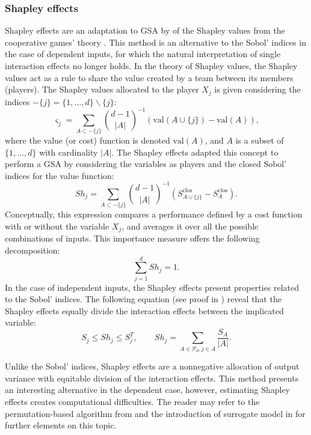 \subsubsection{Shapley effects}
Shapley effects are an adaptation to GSA by \citet{owen_2014_shapley} of the Shapley values from the cooperative games' theory \citep{shapley_1953}. 
This method is an alternative to the Sobol' indices in the case of dependent inputs, for which the natural interpretation of single interaction effects no longer holds. 
In the theory of Shapley values, the Shapley values act as a rule to share the value created by a team between its members (players). 
The Shapley values allocated to the player $X_j$ is given considering the indices $-\{j\}= \{1, \dots, d\} \backslash \{j\}$:
\begin{equation}
    \varsigma_j = \sum_{A \subset -\{j\}} \binom{d-1}{|A|}^{-1} \left(\mathrm{val}(A \cup \{j\}) - \mathrm{val}(A)\right),
\end{equation}
where the value (or cost) function is denoted $\mathrm{val}(A)$, and $A$ is a subset of $\{1, \dots, d\}$ with cardinality $|A|$. 
The Shapley effects adapted this concept to perform a GSA by considering the variables as players and the closed Sobol' indices for the value function: 
\begin{equation}
    \label{eq:shapley_effects}
    Sh_j = \sum_{A \subset -\{j\}} \binom{d-1}{|A|}^{-1} \left(S_{A \cup \{j\}}^{\mathrm{clos}} - S_A^{\mathrm{clos}}\right).
\end{equation}
Conceptually, this expression compares a performance defined by a cost function with or without the variable $X_j$, and averages it over all the possible combinations of inputs.
This importance measure offers the following decomposition: 
\begin{equation}
    \sum_{j=1}^{d} Sh_j = 1.
\end{equation}
In the case of independent inputs, the Shapley effects present properties related to the Sobol' indices. 
The following equation (see proof in \citet{owen_2014_shapley}) reveal that the Shapley effects equally divide the interaction effects between the implicated variable:
\begin{equation}
    S_j \leq Sh_j \leq S_j^T, \qquad Sh_j = \sum_{A \in \mathcal{P}_d, j \in A} \frac{S_A}{|A|}.
\end{equation}   

Unlike the Sobol' indices, Shapley effects are a nonnegative allocation of output variance with equitable division of the interaction effects.   
This method presents an interesting alternative in the dependent case, however, estimating Shapley effects creates computational difficulties.
The reader may refer to the permutation-based algorithm from \citet{song_2016_shapley} and the introduction of surrogate model in \citet{nazben_2019_shapley} for further elements on this topic. 

